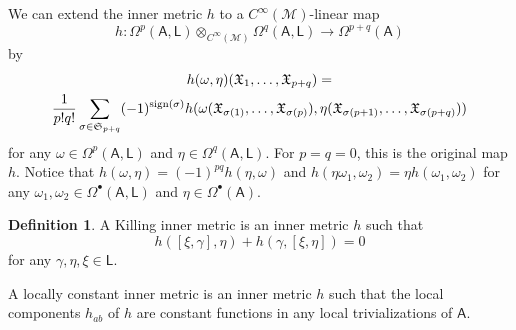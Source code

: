\documentclass[number]{elsarticle}
\theoremstyle{definition}
\newtheorem{definition}[theorem]{Definition}
\theoremstyle{remark}
\numberwithin{equation}{section}
\begin{document}
We can extend the inner metric $h$ to a $C^\infty({{{{\mathcal{{M}}}}}})$-linear map 
\begin{equation*}
h : \Omega^p({{{{\mathbf{\mathsf{{A}}}}}}}, {{{{\mathbf{\mathsf{{L}}}}}}}) \otimes_{C^\infty({{{{\mathcal{{M}}}}}})} \Omega^q({{{{\mathbf{\mathsf{{A}}}}}}}, {{{{\mathbf{\mathsf{{L}}}}}}}) \rightarrow \Omega^{p+q}({{{{\mathbf{\mathsf{{A}}}}}}})
\end{equation*}
by
\begin{multline*}
h(\omega, \eta)({{\mathfrak X}}_1, \dots, {{\mathfrak X}}_{p+q}) =\\
 \frac{1}{p!q!} \sum_{\sigma\in {{\mathfrak S}}_{p+q}} (-1)^{{{\text{\textup{sign}}}}(\sigma)} h(\omega({{\mathfrak X}}_{\sigma(1)}, \dots, {{\mathfrak X}}_{\sigma(p)}), \eta({{\mathfrak X}}_{\sigma(p+1)}, \dots, {{\mathfrak X}}_{\sigma(p+q)}))
\end{multline*}
for any $\omega \in \Omega^p({{{{\mathbf{\mathsf{{A}}}}}}}, {{{{\mathbf{\mathsf{{L}}}}}}})$ and $\eta \in \Omega^q({{{{\mathbf{\mathsf{{A}}}}}}}, {{{{\mathbf{\mathsf{{L}}}}}}})$. For $p=q=0$, this is the original map $h$. Notice that $h(\omega, \eta) = (-1)^{pq} h(\eta, \omega)$ and $h(\eta\omega_1, \omega_2) = \eta h(\omega_1, \omega_2)$ for any $\omega_1, \omega_2 \in \Omega^{\bullet}({{{{\mathbf{\mathsf{{A}}}}}}}, {{{{\mathbf{\mathsf{{L}}}}}}})$ and $\eta \in \Omega^{\bullet}({{{{\mathbf{\mathsf{{A}}}}}}})$.

\begin{definition}
A Killing inner metric is an inner metric $h$ such that 
\begin{equation*}
h([\xi, \gamma], \eta) + h(\gamma, [\xi, \eta]) = 0
\end{equation*}
for any $\gamma, \eta, \xi \in {{{{\mathbf{\mathsf{{L}}}}}}}$.

A locally constant inner metric is an inner metric $h$ such that the local components $h_{ab}$ of $h$ are constant functions in any local trivializations of ${{{{\mathbf{\mathsf{{A}}}}}}}$.
\end{definition}
\end{document}

